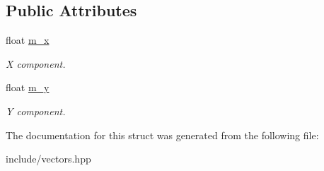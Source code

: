 \subsection*{Public Attributes}
\begin{DoxyCompactItemize}
\item 
\hypertarget{structvec2_a4d73c5efdcf0592cef0cf41c92d53b0f}{float \hyperlink{structvec2_a4d73c5efdcf0592cef0cf41c92d53b0f}{m\-\_\-x}}\label{structvec2_a4d73c5efdcf0592cef0cf41c92d53b0f}

\begin{DoxyCompactList}\small\item\em X component. \end{DoxyCompactList}\item 
\hypertarget{structvec2_aa4b0d5a618ee4a42b34c082f5578461c}{float \hyperlink{structvec2_aa4b0d5a618ee4a42b34c082f5578461c}{m\-\_\-y}}\label{structvec2_aa4b0d5a618ee4a42b34c082f5578461c}

\begin{DoxyCompactList}\small\item\em Y component. \end{DoxyCompactList}\end{DoxyCompactItemize}


The documentation for this struct was generated from the following file\-:\begin{DoxyCompactItemize}
\item 
include/vectors.\-hpp\end{DoxyCompactItemize}
